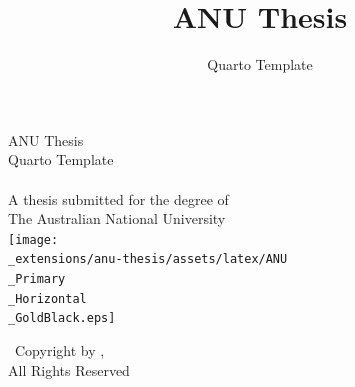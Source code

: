 \documentclass[
  a4paper,
  oneside,
  openany,
  12pt,
  onecolumn]{book}
\title{ANU Thesis}
\subtitle{Quarto Template}
\author{}
\date{}
\begin{document}
  \begin{frontmatter}
  \begin{titlepage}

  \begin{titlepage}
  	\begin{center}
  		\vspace*{0cm}
  		{ \fontsize{24}{10} \selectfont ANU Thesis} \\
  		\vspace{0.3cm}
  		{ \fontsize{20}{10} \selectfont Quarto Template} \\

  		\vspace{2.0cm}
  		{\bf \huge }\\
  		\vspace{2cm}
  		{\large A thesis submitted for the degree of}\\
  		
  		\vspace{0.5cm}
  		{\large The Australian National University}\\
  		
  		\vspace{2.0cm}
  		\texttt{[image: \\\_extensions/anu-thesis/assets/latex/ANU\\\_Primary\\\_Horizontal\\\_GoldBlack.eps]}\\
  		\vspace{2.0cm}
  		

  		
  		
  		
  		\vspace{1.75cm}
  		{\large  \textcopyright\ Copyright by ,  \the\year\\}
  		\vspace{0.5cm}
  		{\large All Rights Reserved}
  	\end{center}
  \end{titlepage}

  \sloppy

  \setlength{\parindent}{0pt}
  \setlength{\parskip}{1ex plus 0.5ex minus 0.2ex}








  \end{titlepage}
  \end{frontmatter}
\end{document}
